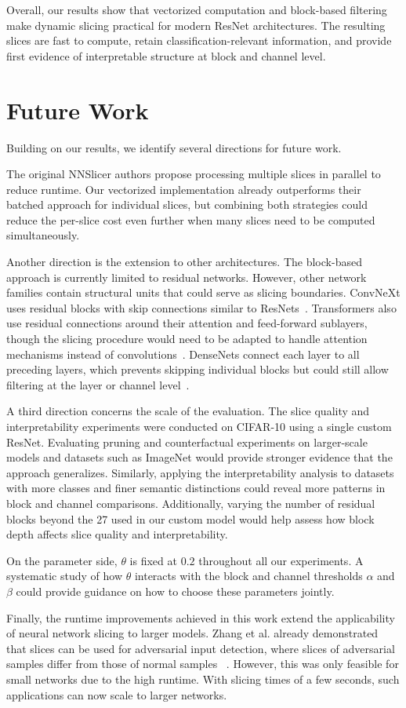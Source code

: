 \documentclass[
12pt,
fancyheadings,
a4paper,
twoside,
BCOR=0.7cm,
nobcorignoretitle,
grayscalebody,
]{stsreprt}
\begin{document}
Overall, our results show that vectorized computation and block-based filtering make dynamic
slicing practical for modern ResNet architectures.
The resulting slices are fast to compute, retain classification-relevant information, and provide
first evidence of interpretable structure at block and channel level.


\section{Future Work}

Building on our results, we identify several directions for future work.

The original NNSlicer authors propose processing multiple slices in parallel to reduce runtime.
Our vectorized implementation already outperforms their batched approach for individual slices, but
combining both strategies could reduce the per-slice cost even further when many slices need to be
computed simultaneously.

Another direction is the extension to other architectures. The block-based approach is currently
limited to residual networks.
However, other network families contain structural units that could serve as slicing boundaries.
ConvNeXt uses residual blocks with skip connections similar to ResNets~\cite{liu2022convnet}.
Transformers also use residual connections around their attention and feed-forward sublayers,
though the slicing procedure would need to be adapted to handle attention mechanisms instead of
convolutions~\cite{vaswani2017attention}.
DenseNets connect each layer to all preceding layers, which prevents skipping individual blocks but
could still allow filtering at the layer or channel level~\cite{huang2017densely}.

A third direction concerns the scale of the evaluation. The slice quality and interpretability
experiments were conducted on CIFAR-10 using a single custom ResNet.
Evaluating pruning and counterfactual experiments on larger-scale models and datasets such as
ImageNet would provide stronger evidence that the approach generalizes.
Similarly, applying the interpretability analysis to datasets with more classes and finer semantic
distinctions could reveal more patterns in block and channel comparisons.
Additionally, varying the number of residual blocks beyond the 27 used in our custom model would
help assess how block depth affects slice quality and interpretability.

On the parameter side, $\theta$ is fixed at $0.2$ throughout all our experiments. A systematic
study of how $\theta$ interacts with the block and channel thresholds $\alpha$ and $\beta$ could
provide guidance on how to choose these parameters jointly.

Finally, the runtime improvements achieved in this work extend the applicability of neural network
slicing to larger models.
Zhang et al. already demonstrated that slices can be used for adversarial input detection, where
slices of adversarial samples differ from those of normal samples~\cite{zhang2020dynamic} .
However, this was only feasible for small networks due to the high runtime.
With slicing times of a few seconds, such applications can now scale to larger networks.

\backmatter
\printbibliography
\end{document}
